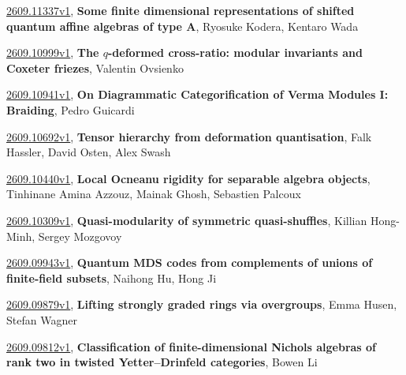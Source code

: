 \documentclass[9pt, a4paper]{article}
\theoremstyle{plain}
\theoremstyle{definition}
\theoremstyle{remark}
\newcommand{\arxiv}[3]{\href{https://arxiv.org/abs/#1}{#1}, \textbf{\textcolor{arxivblue}{#2}}, #3}
\begin{document}
\arxiv{2609.11337v1}{Some finite dimensional representations of shifted quantum affine algebras of type A}{Ryosuke Kodera, Kentaro Wada}

\arxiv{2609.10999v1}{The $q$-deformed cross-ratio: modular invariants and Coxeter friezes}{Valentin Ovsienko}

\arxiv{2609.10941v1}{On Diagrammatic Categorification of Verma Modules I: Braiding}{Pedro Guicardi}

\arxiv{2609.10692v1}{Tensor hierarchy from deformation quantisation}{Falk Hassler, David Osten, Alex Swash}

\arxiv{2609.10440v1}{Local Ocneanu rigidity for separable algebra objects}{Tinhinane Amina Azzouz, Mainak Ghosh, Sebastien Palcoux}

\arxiv{2609.10309v1}{Quasi-modularity of symmetric quasi-shuffles}{Killian Hong-Minh, Sergey Mozgovoy}

\arxiv{2609.09943v1}{Quantum MDS codes from complements of unions of finite-field subsets}{Naihong Hu, Hong Ji}

\arxiv{2609.09879v1}{Lifting strongly graded rings via overgroups}{Emma Husen, Stefan Wagner}

\arxiv{2609.09812v1}{Classification of finite-dimensional Nichols algebras of rank two in twisted Yetter--Drinfeld categories}{Bowen Li}

\end{document}
